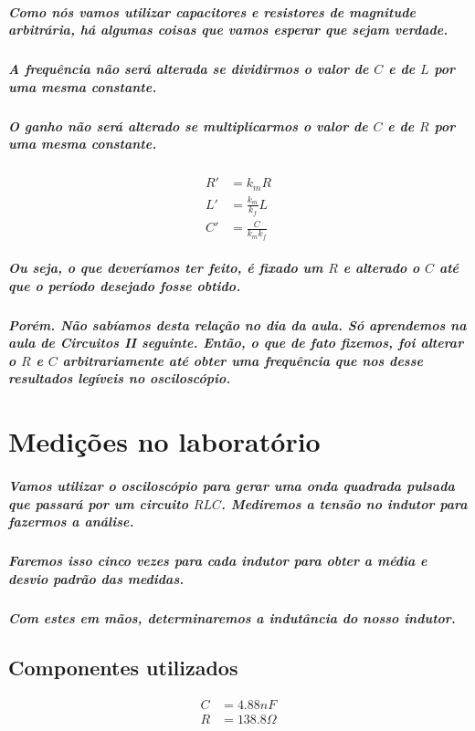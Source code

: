 \documentclass[12pt,twoside, a4paper, twocolumn]{article}
\begin{document}
\subparagraph*{Como nós vamos utilizar capacitores e resistores de magnitude arbitrária, há algumas coisas que vamos esperar que sejam verdade.}


\subparagraph*{A frequência não será alterada se dividirmos o valor de $C$ e de $L$ por uma mesma constante.}


\subparagraph*{O ganho não será alterado se multiplicarmos o valor de $C$ e de $R$ por uma mesma constante.}
\subparagraph*{}
\begin{equation}
    \begin{aligned}
        R' & = k_m R             \\
        L' & = \frac{k_m}{k_f} L \\
        C' & = \frac{C}{k_m k_f}
    \end{aligned}
\end{equation}


\subparagraph*{Ou seja, o que deveríamos ter feito, é fixado um $R$ e alterado o $C$ até que o período desejado fosse obtido.}


\subparagraph*{Porém. Não sabíamos desta relação no dia da aula. Só aprendemos na aula de Circuitos II seguinte. Então, o que de fato fizemos, foi alterar o $R$ e $C$ arbitrariamente até obter uma frequência que nos desse resultados legíveis no osciloscópio.}


\section{Medições no laboratório}


\subparagraph*{Vamos utilizar o osciloscópio para gerar uma onda quadrada pulsada que passará por um circuito $RLC$. Mediremos a tensão no indutor para fazermos a análise.}


\subparagraph*{Faremos isso cinco vezes para cada indutor para obter a média e desvio padrão das medidas.}


\subparagraph*{Com estes em mãos, determinaremos a indutância do nosso indutor.}


\subsection{Componentes utilizados}


\begin{equation}
    \begin{aligned}
        C & = 4.88nF          \\
        R & = 138.8 \varOmega \\
    \end{aligned}
\end{equation}
\end{document}
